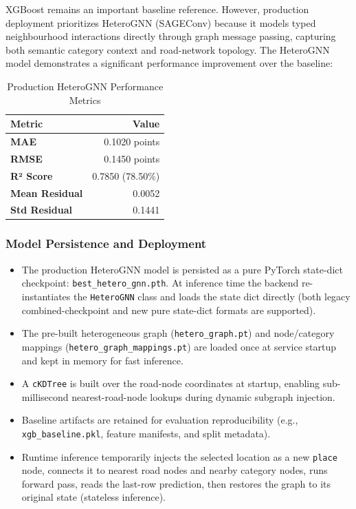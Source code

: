 XGBoost remains an important baseline reference. However, production deployment prioritizes HeteroGNN (SAGEConv) because it models typed neighbourhood interactions directly through graph message passing, capturing both semantic category context and road-network topology. The HeteroGNN model demonstrates a significant performance improvement over the baseline:

\begin{table}[htbp]
\centering
\begin{tabular}{|l|r|}
	\hline
	\textbf{Metric} & \textbf{Value} \\
	\hline
	\textbf{MAE} & 0.1020 points \\
	\textbf{RMSE} & 0.1450 points \\
	\textbf{R² Score} & 0.7850 (78.50\%) \\
	\textbf{Mean Residual} & 0.0052 \\
	\textbf{Std Residual} & 0.1441 \\
	\hline
\end{tabular}
\caption{Production HeteroGNN Performance Metrics}
\label{tab:model-performance-heterognn}
\end{table}

\subsubsection{Model Persistence and Deployment}
\begin{itemize}
	\item The production HeteroGNN model is persisted as a pure PyTorch state-dict checkpoint: \texttt{best\_hetero\_gnn.pth}. At inference time the backend re-instantiates the \texttt{HeteroGNN} class and loads the state dict directly (both legacy combined-checkpoint and new pure state-dict formats are supported).
	\item The pre-built heterogeneous graph (\texttt{hetero\_graph.pt}) and node/category mappings (\texttt{hetero\_graph\_mappings.pt}) are loaded once at service startup and kept in memory for fast inference.
	\item A \texttt{cKDTree} is built over the road-node coordinates at startup, enabling sub-millisecond nearest-road-node lookups during dynamic subgraph injection.
	\item Baseline artifacts are retained for evaluation reproducibility (e.g., \texttt{xgb\_baseline.pkl}, feature manifests, and split metadata).
	\item Runtime inference temporarily injects the selected location as a new \texttt{place} node, connects it to nearest road nodes and nearby category nodes, runs forward pass, reads the last-row prediction, then restores the graph to its original state (stateless inference).
\end{itemize}

